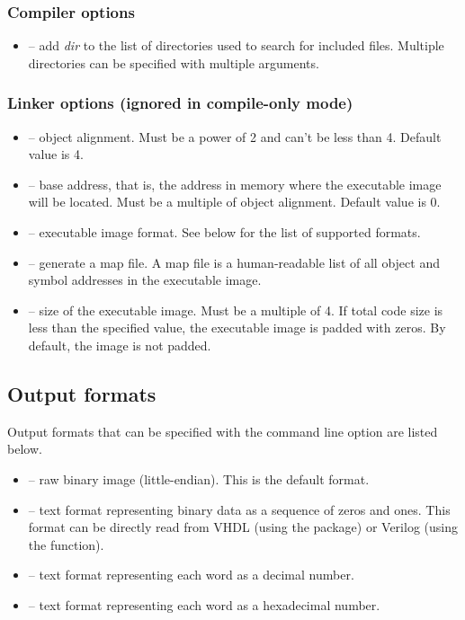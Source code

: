 \documentclass[a4paper,12pt,twoside,extrafontsizes]{memoir}
\begin{document}
\subsubsection{Compiler options}

\begin{itemize}
	\item {} -- add \emph{dir} to the list of directories used to search for included files. Multiple directories can be specified with multiple  arguments.
\end{itemize}

\subsubsection{Linker options (ignored in compile-only mode)}

\begin{itemize}
	\item {} -- object alignment. Must be a power of 2 and can't be less than 4. Default value is 4.
	
	\item {} -- base address, that is, the address in memory where the executable image will be located. Must be a multiple of object alignment. Default value is 0.
	
	\item {} -- executable image format. See below for the list of supported formats.
	
	\item {} -- generate a map file. A map file is a human-readable list of all object and symbol addresses in the executable image.
	
	\item {} -- size of the executable image. Must be a multiple of 4. If total code size is less than the specified value, the executable image is padded with zeros. By default, the image is not padded.
\end{itemize}

\subsection{Output formats}

Output formats that can be specified with the  command line option are listed below.

\begin{itemize}
	\item {} -- raw binary image (little-endian). This is the default format.
	\item {} -- text format representing binary data as a sequence of zeros and ones. This format can be directly read from VHDL (using the  package) or Verilog\textregistered{} (using the  function).
	\item {} -- text format representing each word as a decimal number.
	\item {} -- text format representing each word as a hexadecimal number.
\end{itemize}
\end{document}
